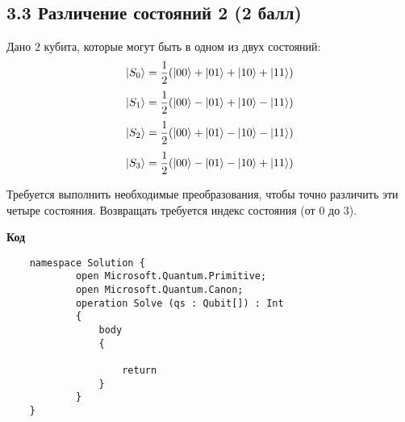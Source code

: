\documentclass{article}
\DeclarePairedDelimiter\ket{\lvert}{\rangle}
\begin{document}
    
\newpage


\subsection*{3.3 Различение состояний 2 (2 балл)}

    Дано $2$ кубита, которые могут быть в одном из двух состояний:
    $$\ket{S_0} = \frac{1}{2}(\ket{00} + \ket{01} + \ket{10} + \ket{11})$$
    $$\ket{S_1} = \frac{1}{2}(\ket{00} - \ket{01} + \ket{10} - \ket{11})$$
    $$\ket{S_2} = \frac{1}{2}(\ket{00} + \ket{01} - \ket{10} - \ket{11})$$
    $$\ket{S_3} = \frac{1}{2}(\ket{00} - \ket{01} - \ket{10} + \ket{11})$$
    
    
    Требуется выполнить необходимые преобразования, чтобы точно различить эти четыре состояния. Возвращать требуется индекс состояния (от $0$ до $3$). 
   
    \textbf{Код}
    
    \begin{lstlisting}
    namespace Solution {
            open Microsoft.Quantum.Primitive;
            open Microsoft.Quantum.Canon;
            operation Solve (qs : Qubit[]) : Int
            {
                body
                {
    
                    return 
                }
            }
    }
    \end{lstlisting}
\end{document}
